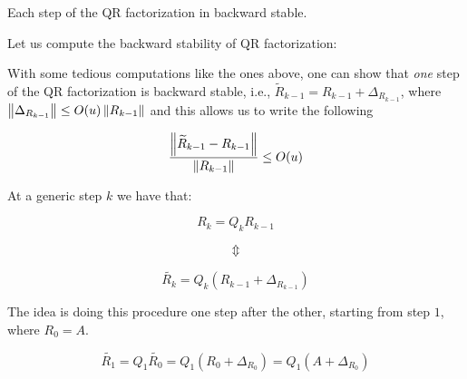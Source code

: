 \documentclass[computational_mathematics.tex]{subfiles}
\begin{document}

Each step of the QR factorization in backward stable.

Let us compute the backward stability of QR factorization:

With some tedious computations like the ones above, one can show that \emph{one} step of the QR factorization is backward stable, i.e., ${\widetilde{R}}_{k-1} = R_{k-1} + \Delta_{R_{k-1}}$, where $\left\lVert\Delta_{R_{k-1}}\right\rVert \le O(u) \left\lVert R_{k-1}\right\rVert$ and this allows us to write the following

\[
  \frac{\left\lVert{\widetilde{R}}_{k-1} - R_{k-1}\right\rVert}{\left\lVert R_{k-1}\right\rVert} \le O(u)
\]

At a generic step $k$ we have that:

\[
  R_k = Q_k R_{k-1}
\]

\[
  \Updownarrow
\]

\[
  \widetilde{R_k} = Q_k (R_{k-1} + \Delta_{R_{k-1}})
\]

The idea is doing this procedure one step after the other, starting from step $1$, where $R_0 = A$.

\[
  \widetilde{R_1} = Q_1 \widetilde{R_0} = Q_1 (R_0 + \Delta_{R_0}) = Q_1 (A + \Delta_{R_0})
\]
\end{document}

